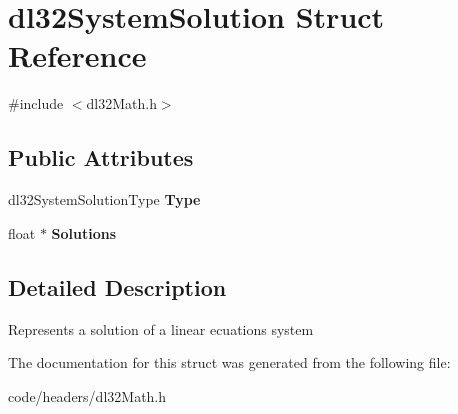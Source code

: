 \hypertarget{structdl32_system_solution}{\section{dl32\-System\-Solution Struct Reference}
\label{structdl32_system_solution}
}


{\ttfamily \#include $<$dl32\-Math.\-h$>$}

\subsection*{Public Attributes}
\begin{DoxyCompactItemize}
\item 
\hypertarget{structdl32_system_solution_a93b6762eb4018f04c71da7f695cee288}{dl32\-System\-Solution\-Type {\bfseries Type}}\label{structdl32_system_solution_a93b6762eb4018f04c71da7f695cee288}

\item 
\hypertarget{structdl32_system_solution_aa9b480e8355d1a76aab2829444478a5c}{float $\ast$ {\bfseries Solutions}}\label{structdl32_system_solution_aa9b480e8355d1a76aab2829444478a5c}

\end{DoxyCompactItemize}


\subsection{Detailed Description}
Represents a solution of a linear ecuations system 

The documentation for this struct was generated from the following file\-:\begin{DoxyCompactItemize}
\item 
code/headers/dl32\-Math.\-h\end{DoxyCompactItemize}
